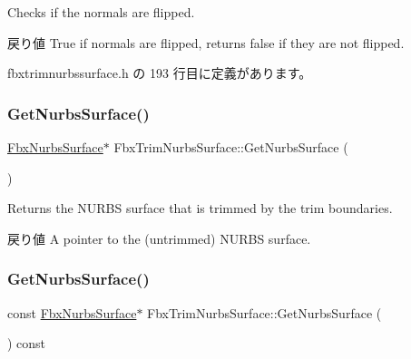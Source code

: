 Checks if the normals are flipped. \begin{DoxyReturn}{戻り値}
{\ttfamily True} if normals are flipped, returns {\ttfamily false} if they are not flipped. 
\end{DoxyReturn}


 fbxtrimnurbssurface.\+h の 193 行目に定義があります。

\mbox{\label{class_fbx_trim_nurbs_surface_a59e3a2e5a7d89476e0bbd61dcf00aede}} 
\subsubsection{\texorpdfstring{Get\+Nurbs\+Surface()}{GetNurbsSurface()}\hspace{0.1cm}{\footnotesize\ttfamily [1/2]}}
{\footnotesize\ttfamily \hyperlink{class_fbx_nurbs_surface}{Fbx\+Nurbs\+Surface}$\ast$ Fbx\+Trim\+Nurbs\+Surface\+::\+Get\+Nurbs\+Surface (\begin{DoxyParamCaption}{ }\end{DoxyParamCaption})}

Returns the N\+U\+R\+BS surface that is trimmed by the trim boundaries. \begin{DoxyReturn}{戻り値}
A pointer to the (untrimmed) N\+U\+R\+BS surface. 
\end{DoxyReturn}
\mbox{\label{class_fbx_trim_nurbs_surface_a3fdd293d9f7a6c950e25bd4130772236}} 
\subsubsection{\texorpdfstring{Get\+Nurbs\+Surface()}{GetNurbsSurface()}\hspace{0.1cm}{\footnotesize\ttfamily [2/2]}}
{\footnotesize\ttfamily const \hyperlink{class_fbx_nurbs_surface}{Fbx\+Nurbs\+Surface}$\ast$ Fbx\+Trim\+Nurbs\+Surface\+::\+Get\+Nurbs\+Surface (\begin{DoxyParamCaption}{ }\end{DoxyParamCaption}) const}

